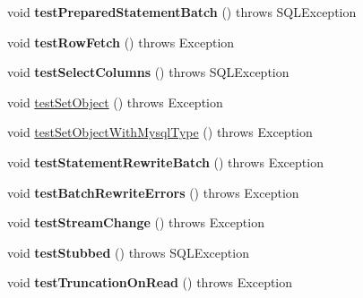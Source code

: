 \begin{DoxyCompactItemize}
void {\bfseries test\+Prepared\+Statement\+Batch} ()  throws S\+Q\+L\+Exception 
\item 
\mbox{\label{classtestsuite_1_1simple_1_1_statements_test_a19fe5f56dfa23d7df03d0654d9cf5737}} 
void {\bfseries test\+Row\+Fetch} ()  throws Exception 
\item 
\mbox{\label{classtestsuite_1_1simple_1_1_statements_test_ad40b0d788d89515d836cdbee5e748fff}} 
void {\bfseries test\+Select\+Columns} ()  throws S\+Q\+L\+Exception 
\item 
void \mbox{\hyperlink{classtestsuite_1_1simple_1_1_statements_test_acf80cede1ff53fcdebca2de611a1c015}{test\+Set\+Object}} ()  throws Exception 
\item 
void \mbox{\hyperlink{classtestsuite_1_1simple_1_1_statements_test_aa625fdb1fdc9d5a572973b63a35a0b05}{test\+Set\+Object\+With\+Mysql\+Type}} ()  throws Exception 
\item 
\mbox{\label{classtestsuite_1_1simple_1_1_statements_test_a30f552176c9ad0cd34ab51a8b90ab0ee}} 
void {\bfseries test\+Statement\+Rewrite\+Batch} ()  throws Exception 
\item 
\mbox{\label{classtestsuite_1_1simple_1_1_statements_test_a104f5db994108a1a798fde9e3f86761f}} 
void {\bfseries test\+Batch\+Rewrite\+Errors} ()  throws Exception 
\item 
\mbox{\label{classtestsuite_1_1simple_1_1_statements_test_a732ef94880943b2889d9880a0e059b95}} 
void {\bfseries test\+Stream\+Change} ()  throws Exception 
\item 
\mbox{\label{classtestsuite_1_1simple_1_1_statements_test_a10f714e4bdd7ad759e21c30eb9506e1c}} 
void {\bfseries test\+Stubbed} ()  throws S\+Q\+L\+Exception 
\item 
\mbox{\label{classtestsuite_1_1simple_1_1_statements_test_ab2e30242ecd0aa65f25500827a73bfbe}} 
void {\bfseries test\+Truncation\+On\+Read} ()  throws Exception 
\item 

\end{DoxyCompactItemize}
